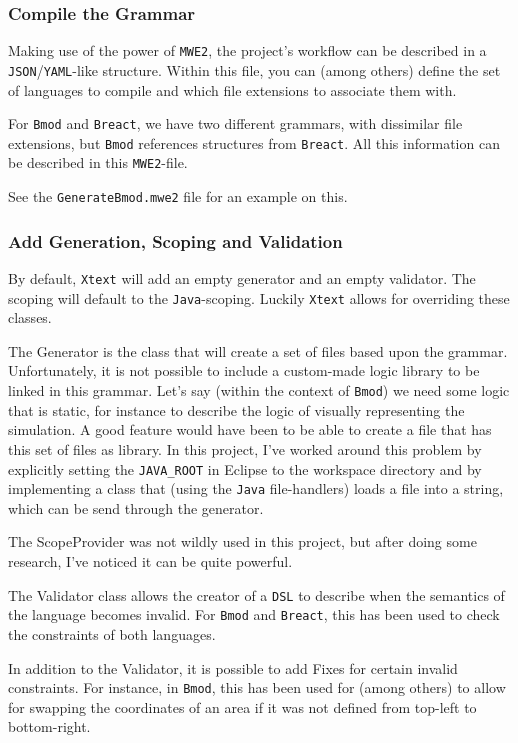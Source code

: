 \documentclass[review]{elsarticle}
\begin{document}
\subsubsection{Compile the Grammar}
Making use of the power of \texttt{MWE2}, the project's workflow can be described in a \texttt{JSON}/\texttt{YAML}-like structure. Within this file, you can (among others) define the set of languages to compile and which file extensions to associate them with.

For \texttt{Bmod} and \texttt{Breact}, we have two different grammars, with dissimilar file extensions, but \texttt{Bmod} references structures from \texttt{Breact}. All this information can be described in this \texttt{MWE2}-file.

See the \texttt{GenerateBmod.mwe2} file for an example on this.

\subsubsection{Add Generation, Scoping and Validation}
By default, \texttt{Xtext} will add an empty generator and an empty validator. The scoping will default to the \texttt{Java}-scoping. Luckily \texttt{Xtext} allows for overriding these classes.

The \textsf{Generator} is the class that will create a set of files based upon the grammar. Unfortunately, it is not possible to include a custom-made logic library to be linked in this grammar. Let's say (within the context of \texttt{Bmod}) we need some logic that is static, for instance to describe the logic of visually representing the simulation. A good feature would have been to be able to create a file that has this set of files as library. In this project, I've worked around this problem by explicitly setting the \texttt{JAVA\_ROOT} in \textsf{Eclipse} to the workspace directory and by implementing a class that (using the \texttt{Java} file-handlers) loads a file into a string, which can be send through the generator.

The \textsf{ScopeProvider} was not wildly used in this project, but after doing some research, I've noticed it can be quite powerful.

The \textsf{Validator} class allows the creator of a \texttt{DSL} to describe when the semantics of the language becomes invalid. For \texttt{Bmod} and \texttt{Breact}, this has been used to check the constraints of both languages.

In addition to the \textsf{Validator}, it is possible to add \textsf{Fixes} for certain invalid constraints. For instance, in \texttt{Bmod}, this has been used for (among others) to allow for swapping the coordinates of an area if it was not defined from top-left to bottom-right.
\end{document}
